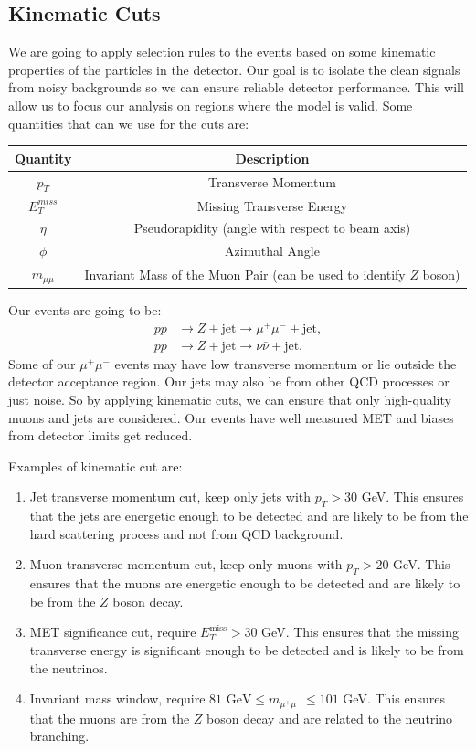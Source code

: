 \subsection{Kinematic Cuts}
We are going to apply selection rules to the events based on some kinematic properties of the particles in the detector. Our goal is to isolate the clean signals from noisy backgrounds so we can ensure reliable detector performance. This will allow us to focus our analysis on regions where the model is valid. Some quantities that can we use for the cuts are:
\begin{table}[ht]
    \centering
    \begin{tabular}{|c|c|}
    \hline
    \textbf{Quantity} & \textbf{Description} \\
    \hline
    $p_T$ & Transverse Momentum \\
    $E^{miss}_T$ & Missing Transverse Energy \\
    $\eta$ & Pseudorapidity (angle with respect to beam axis) \\
    $\phi$ & Azimuthal Angle \\
    $m_{\mu \mu}$ & Invariant Mass of the Muon Pair (can be used to identify $Z$ boson) \\
    \hline
    \end{tabular}
    \label{tab:key_quantities}
    \end{table}

Our events are going to be:
\begin{align*}
    pp &\to Z + \text{jet} \to \mu^+ \mu^- + \text{jet}, \\
    pp &\to Z + \text{jet} \to \nu \bar{\nu} + \text{jet}.
    \end{align*}
Some of our $\mu^+ \mu^-$  events may have low transverse momentum or lie outside the detector acceptance region. Our jets may also be from other QCD processes or just noise. So by applying kinematic cuts, we can ensure that only high-quality muons and jets are considered. Our events have well measured MET and biases from detector limits get reduced.

Examples of kinematic cut are:
\begin{enumerate}
    \item Jet transverse momentum cut, keep only jets with $p_T > 30$ GeV. This ensures that the jets are energetic enough to be detected and are likely to be from the hard scattering process and not from QCD background.
    \item Muon transverse momentum cut, keep only muons with $p_T > 20$ GeV. This ensures that the muons are energetic enough to be detected and are likely to be from the $Z$ boson decay.
    \item MET significance cut, require $E^{\text{miss}}_T > 30$ GeV. This ensures that the missing transverse energy is significant enough to be detected and is likely to be from the neutrinos.
    \item Invariant mass window, require $ 81 \text{ GeV} \leq m_{\mu^+ \mu^-} \leq 101$ GeV. This ensures that the muons are from the $Z$ boson decay and are related to the neutrino branching. 
\end{enumerate}
